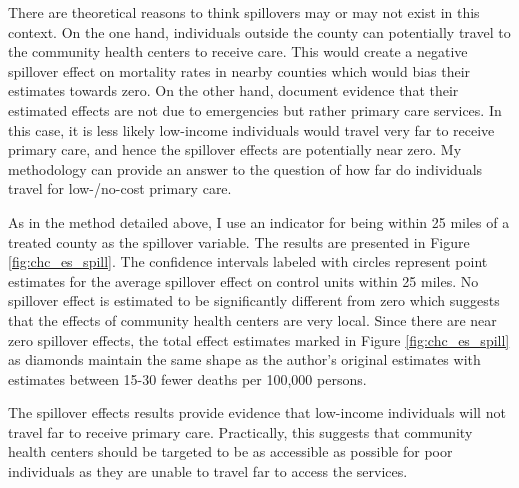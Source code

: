 \documentclass[11pt]{article}
\begin{document}
There are theoretical reasons to think spillovers may or may not exist in this context. On the one hand, individuals outside the county can potentially travel to the community health centers to receive care. This would create a negative spillover effect on mortality rates in nearby counties which would bias their estimates towards zero. On the other hand, \citet{Bailey_Goodman_Bacon_2015} document evidence that their estimated effects are not due to emergencies but rather primary care services. In this case, it is less likely low-income individuals would travel very far to receive primary care, and hence the spillover effects are potentially near zero. My methodology can provide an answer to the question of how far do individuals travel for low-/no-cost primary care.

As in the method detailed above, I use an indicator for being within 25 miles of a treated county as the spillover variable. The results are presented in Figure \ref{fig:chc_es_spill}. The confidence intervals labeled with circles represent point estimates for the average spillover effect on control units within 25 miles. No spillover effect is estimated to be significantly different from zero which suggests that the effects of community health centers are very local. Since there are near zero spillover effects, the total effect estimates marked in Figure \ref{fig:chc_es_spill} as diamonds maintain the same shape as the author's original estimates with estimates between 15-30 fewer deaths per 100,000 persons. 

The spillover effects results provide evidence that low-income individuals will not travel far to receive primary care. Practically, this suggests that community health centers should be targeted to be as accessible as possible for poor individuals as they are unable to travel far to access the services. 
\end{document}
